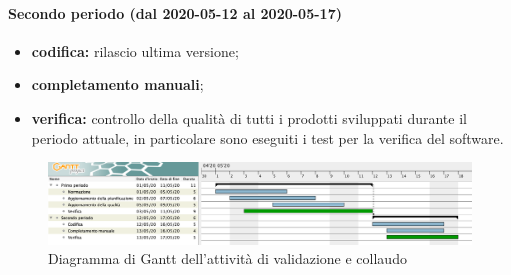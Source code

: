 				\paragraph{Secondo periodo (dal 2020-05-12 al 2020-05-17)}
				
					\begin{itemize}
						\item \textbf{codifica:} rilascio ultima versione;
						\item \textbf{completamento manuali};
						\item \textbf{verifica:} controllo della qualità di tutti i prodotti sviluppati durante il periodo attuale, in particolare sono eseguiti i test per la verifica del software.
					\end{itemize}

			
		\begin{landscape}

          \begin{figure}[H]
            \centering
            \includegraphics[width=\linewidth]{images/gantt/validazioneCollaudo}
            \caption{Diagramma di Gantt dell'attività di validazione e collaudo}
          \end{figure}

		\end{landscape}

